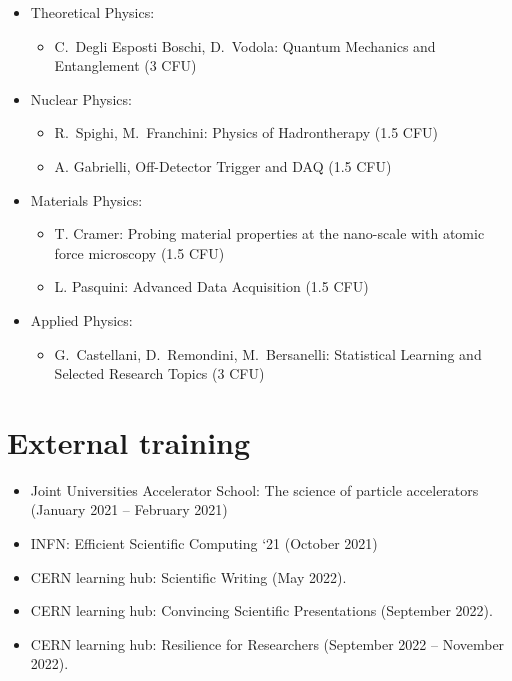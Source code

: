 \begin{itemize}
    \item Theoretical Physics:
    \begin{itemize}
        \item C.\ Degli Esposti Boschi, D.\ Vodola: Quantum Mechanics and Entanglement (3 CFU)
    \end{itemize}
    \item Nuclear Physics:
    \begin{itemize}
        \item R.\ Spighi, M.\ Franchini: Physics of Hadrontherapy (1.5 CFU)
        \item A. Gabrielli, Off-Detector Trigger and DAQ (1.5 CFU)
    \end{itemize}
    \item Materials Physics:
    \begin{itemize}
        \item T. Cramer: Probing material properties at the nano-scale with atomic force microscopy (1.5 CFU)
        \item L. Pasquini: Advanced Data Acquisition (1.5 CFU)
    \end{itemize}
    \item Applied Physics:
    \begin{itemize}
        \item G.\ Castellani, D.\ Remondini, M.\ Bersanelli: Statistical Learning and Selected Research Topics (3 CFU) 
    \end{itemize} 
\end{itemize} 

\section*{External training}

\begin{itemize}
    \item Joint Universities Accelerator School: The science of particle accelerators (January 2021 -- February 2021)
    \item INFN: Efficient Scientific Computing `21 (October 2021)
    \item CERN learning hub:  Scientific Writing (May 2022).
    \item CERN learning hub:  Convincing Scientific Presentations (September 2022).
    \item CERN learning hub:  Resilience for Researchers (September 2022 -- November 2022).
    
\end{itemize}